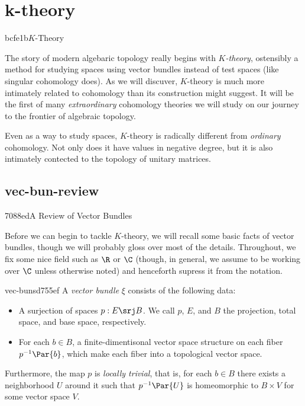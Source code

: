 \makeatletter{}\makeatother

\chapter{k-theory}{bcfe1b}{$K$-Theory}

The story of modern algebaric topology really begins with \emph{$K$-theory},
ostensibly a method for studying spaces using vector bundles instead of
test spaces (like singular cohomology does). As we will discuver, $K$-theory
is much more intimately related to cohomology than its construction might
suggest. It will be the first of many \emph{extraordinary} cohomology theories
we will study on our journey to the frontier of algebraic topology.

Even as a way to study spaces, $K$-theory is radically different from 
\emph{ordinary} cohomology. Not only does it have values in negative degree,
but it is also intimately contected to the topology of unitary matrices.

\section{vec-bun-review}{7088ed}{A Review of Vector Bundles}

Before we can begin to tackle $K$-theory, we will recall some basic facts
of vector bundles, though we will probably gloss over most of the details.
Throughout, we fix some nice field such as $\R$ or $\C$ (though, in general,
we assume to be working over $\C$ unless otherwise noted) and henceforth
supress it from the notation.

\begin{defn}{vec-buns}{d755ef}
  A \emph{vector bundle} $\xi$ consists of the following data:
  \begin{itemize}
    \item A surjection of spaces $p: E \srj B$. We call $p$, $E$, and $B$ the
          projection, total space, and base space, respectively.
    \item For each $b\in B$, a finite-dimentisonal vector space structure 
          on each fiber $p^{-1}\Par{b}$, which make each fiber into a 
          topological vector space.
  \end{itemize}  
  Furthermore, the map $p$ is \emph{locally trivial}, that is, for each 
  $b\in B$ there exists a neighborhood $U$ around it such that $p^{-1}\Par{U}$
  is homeomorphic to $B \times V$ for some vector space $V$.
\end{defn}

